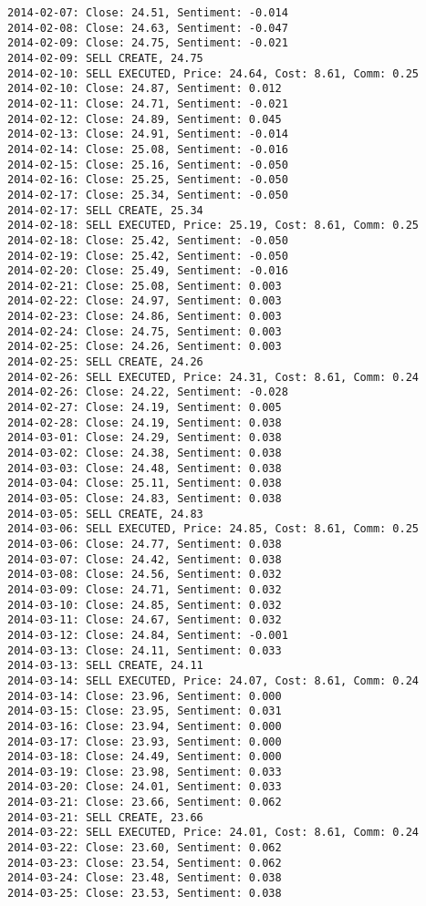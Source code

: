 \documentclass[11pt]{article}
\begin{document}
\begin{Verbatim}[commandchars=\\\{\}]
2014-02-07: Close: 24.51, Sentiment: -0.014
2014-02-08: Close: 24.63, Sentiment: -0.047
2014-02-09: Close: 24.75, Sentiment: -0.021
2014-02-09: SELL CREATE, 24.75
2014-02-10: SELL EXECUTED, Price: 24.64, Cost: 8.61, Comm: 0.25
2014-02-10: Close: 24.87, Sentiment: 0.012
2014-02-11: Close: 24.71, Sentiment: -0.021
2014-02-12: Close: 24.89, Sentiment: 0.045
2014-02-13: Close: 24.91, Sentiment: -0.014
2014-02-14: Close: 25.08, Sentiment: -0.016
2014-02-15: Close: 25.16, Sentiment: -0.050
2014-02-16: Close: 25.25, Sentiment: -0.050
2014-02-17: Close: 25.34, Sentiment: -0.050
2014-02-17: SELL CREATE, 25.34
2014-02-18: SELL EXECUTED, Price: 25.19, Cost: 8.61, Comm: 0.25
2014-02-18: Close: 25.42, Sentiment: -0.050
2014-02-19: Close: 25.42, Sentiment: -0.050
2014-02-20: Close: 25.49, Sentiment: -0.016
2014-02-21: Close: 25.08, Sentiment: 0.003
2014-02-22: Close: 24.97, Sentiment: 0.003
2014-02-23: Close: 24.86, Sentiment: 0.003
2014-02-24: Close: 24.75, Sentiment: 0.003
2014-02-25: Close: 24.26, Sentiment: 0.003
2014-02-25: SELL CREATE, 24.26
2014-02-26: SELL EXECUTED, Price: 24.31, Cost: 8.61, Comm: 0.24
2014-02-26: Close: 24.22, Sentiment: -0.028
2014-02-27: Close: 24.19, Sentiment: 0.005
2014-02-28: Close: 24.19, Sentiment: 0.038
2014-03-01: Close: 24.29, Sentiment: 0.038
2014-03-02: Close: 24.38, Sentiment: 0.038
2014-03-03: Close: 24.48, Sentiment: 0.038
2014-03-04: Close: 25.11, Sentiment: 0.038
2014-03-05: Close: 24.83, Sentiment: 0.038
2014-03-05: SELL CREATE, 24.83
2014-03-06: SELL EXECUTED, Price: 24.85, Cost: 8.61, Comm: 0.25
2014-03-06: Close: 24.77, Sentiment: 0.038
2014-03-07: Close: 24.42, Sentiment: 0.038
2014-03-08: Close: 24.56, Sentiment: 0.032
2014-03-09: Close: 24.71, Sentiment: 0.032
2014-03-10: Close: 24.85, Sentiment: 0.032
2014-03-11: Close: 24.67, Sentiment: 0.032
2014-03-12: Close: 24.84, Sentiment: -0.001
2014-03-13: Close: 24.11, Sentiment: 0.033
2014-03-13: SELL CREATE, 24.11
2014-03-14: SELL EXECUTED, Price: 24.07, Cost: 8.61, Comm: 0.24
2014-03-14: Close: 23.96, Sentiment: 0.000
2014-03-15: Close: 23.95, Sentiment: 0.031
2014-03-16: Close: 23.94, Sentiment: 0.000
2014-03-17: Close: 23.93, Sentiment: 0.000
2014-03-18: Close: 24.49, Sentiment: 0.000
2014-03-19: Close: 23.98, Sentiment: 0.033
2014-03-20: Close: 24.01, Sentiment: 0.033
2014-03-21: Close: 23.66, Sentiment: 0.062
2014-03-21: SELL CREATE, 23.66
2014-03-22: SELL EXECUTED, Price: 24.01, Cost: 8.61, Comm: 0.24
2014-03-22: Close: 23.60, Sentiment: 0.062
2014-03-23: Close: 23.54, Sentiment: 0.062
2014-03-24: Close: 23.48, Sentiment: 0.038
2014-03-25: Close: 23.53, Sentiment: 0.038

\end{Verbatim}
\end{document}
